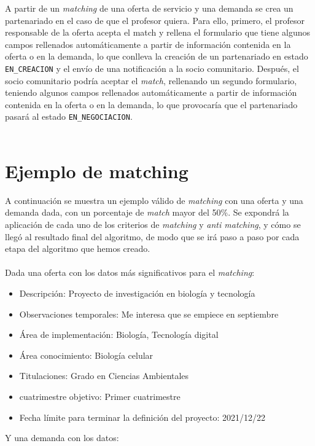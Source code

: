 \documentclass[11pt]{book}
\begin{document}
A partir de un \emph{matching} de una oferta de servicio y una demanda se crea un partenariado en el caso de que el profesor quiera. Para ello, primero, el profesor responsable de la oferta acepta el match y rellena el formulario que tiene  algunos campos rellenados automáticamente a partir de información contenida en la oferta o en la demanda, lo que conlleva la creación de un partenariado en estado \texttt{EN\_CREACION} y el envío de una notificación a la socio comunitario. Después, el socio comunitario podría aceptar el \emph{match}, rellenando un segundo formulario, teniendo algunos campos rellenados automáticamente a partir de información contenida en la oferta o en la demanda, lo que provocaría que el partenariado pasará al estado \texttt{EN\_NEGOCIACION}.\\\\
\section{Ejemplo de matching}
A continuación se muestra un ejemplo válido de \emph{matching} con una oferta y una demanda dada, con un porcentaje de \emph{match} mayor del 50\%. Se expondrá la aplicación de cada uno de los criterios de \emph{matching} y \emph{anti matching}, y cómo se llegó al resultado final del algoritmo, de modo que se irá paso a paso por cada etapa del algoritmo que hemos creado.\\\\
Dada una oferta con los datos más significativos para el \emph{matching}:\\
\begin{itemize} 
	\item Descripción: Proyecto de investigación en biología y tecnología
	\item Observaciones temporales: Me interesa que se empiece en septiembre
	\item Área de implementación: Biología, Tecnología digital
	\item Área conocimiento: Biología celular
	\item Titulaciones: Grado en Ciencias Ambientales
	\item cuatrimestre objetivo: Primer cuatrimestre
	\item Fecha límite para terminar la definición del proyecto: 2021/12/22
	\\
\end{itemize}
Y una demanda con los datos:\\
\end{document}
